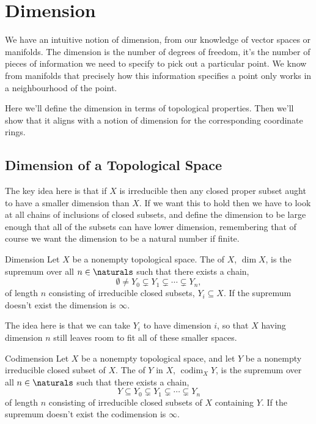 \documentclass[fleqn]{NotesClass}
\DeclareMathOperator{\codim}{codim}
\begin{document}
    \chapter{Dimension}
    We have an intuitive notion of dimension, from our knowledge of vector spaces or manifolds.
    The dimension is the number of degrees of freedom, it's the number of pieces of information we need to specify to pick out a particular point.
    We know from manifolds that precisely how this information specifies a point only works in a neighbourhood of the point.
    
    Here we'll define the dimension in terms of topological properties.
    Then we'll show that it aligns with a notion of dimension for the corresponding coordinate rings.
    
    \section{Dimension of a Topological Space}
    The key idea here is that if \(X\) is irreducible then any closed proper subset aught to have a smaller dimension than \(X\).
    If we want this to hold then we have to look at all chains of inclusions of closed subsets, and define the dimension to be large enough that all of the subsets can have lower dimension, remembering that of course we want the dimension to be a natural number if finite.
    
    \begin{dfn}{Dimension}{}
        Let \(X\) be a nonempty topological space.
        The  of \(X\), \(\dim X\), is the supremum over all \(n \in \naturals\) such that there exists a chain,
        \begin{equation}
            \emptyset \neq Y_0 \subsetneq Y_1 \subsetneq \dotsb \subsetneq Y_n,
        \end{equation}
        of length \(n\) consisting of irreducible closed subsets, \(Y_i \subseteq X\).
        If the supremum doesn't exist the dimension is \(\infty\).
    \end{dfn}
    
    The idea here is that we can take \(Y_i\) to have dimension \(i\), so that \(X\) having dimension \(n\) still leaves room to fit all of these smaller spaces.
    
    \begin{dfn}{Codimension}{}
        Let \(X\) be a nonempty topological space, and let \(Y\) be a nonempty irreducible closed subset of \(X\).
        The  of \(Y\) in \(X\), \(\codim_X Y\), is the supremum over all \(n \in \naturals\) such that there exists a chain,
        \begin{equation}
            Y \subseteq Y_0 \subsetneq Y_1 \subsetneq \dotsb \subsetneq Y_n
        \end{equation}
        of length \(n\) consisting of irreducible closed subsets of \(X\) containing \(Y\).
        If the supremum doesn't exist the codimension is \(\infty\).
    \end{dfn}
    
\end{document}
